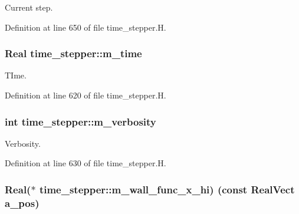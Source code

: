 Current step. 



Definition at line 650 of file time\+\_\+stepper.\+H.

\subsubsection[{\texorpdfstring{m\+\_\+time}{m_time}}]{\setlength{\rightskip}{0pt plus 5cm}Real time\+\_\+stepper\+::m\+\_\+time\hspace{0.3cm}{\ttfamily [protected]}}\hypertarget{classtime__stepper_a491c3c35019477c00296450933ca8bb4}{}\label{classtime__stepper_a491c3c35019477c00296450933ca8bb4}


T\+Ime. 



Definition at line 620 of file time\+\_\+stepper.\+H.

\subsubsection[{\texorpdfstring{m\+\_\+verbosity}{m_verbosity}}]{\setlength{\rightskip}{0pt plus 5cm}int time\+\_\+stepper\+::m\+\_\+verbosity\hspace{0.3cm}{\ttfamily [protected]}}\hypertarget{classtime__stepper_a9af86e24658bec33326091ab5012a924}{}\label{classtime__stepper_a9af86e24658bec33326091ab5012a924}


Verbosity. 



Definition at line 630 of file time\+\_\+stepper.\+H.

\subsubsection[{\texorpdfstring{m\+\_\+wall\+\_\+func\+\_\+x\+\_\+hi}{m_wall_func_x_hi}}]{\setlength{\rightskip}{0pt plus 5cm}Real($\ast$ time\+\_\+stepper\+::m\+\_\+wall\+\_\+func\+\_\+x\+\_\+hi) (const Real\+Vect a\+\_\+pos)\hspace{0.3cm}{\ttfamily [protected]}}\hypertarget{classtime__stepper_ad48ff9f55719c7412afeb182af186d7a}{}\label{classtime__stepper_ad48ff9f55719c7412afeb182af186d7a}


